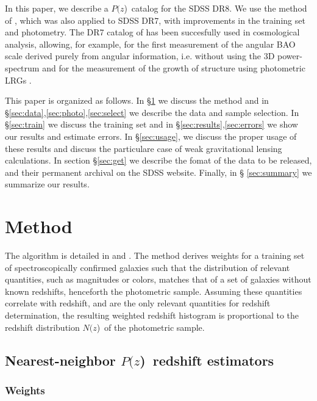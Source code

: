 \documentclass[preprint]{aastex}
\newcommand{\pofz}{$P(z$)}
\newcommand{\Nofz}{$N(z$)}
\begin{document}
In this paper, we describe a \pofz\ catalog for the SDSS DR8.  We use the
method of \citet{CunhaPhotoz09}, which was also applied to SDSS DR7, with
improvements in the training set and  photometry.  The DR7 catalog of
\cite{CunhaPhotoz09} has been succesfully used in cosmological analysis,
allowing, for example, for the  first measurement of the angular BAO scale
derived purely from angular information, i.e. without using the 3D
power-spectrum \citep{car11}  and for the measurement of the growth of
structure using photometric LRGs \citep{cro11}. 

This paper is organized as follows.  In \S \ref{sec:method} we discuss the
method and in \S \ref{sec:data},\ref{sec:photo},\ref{sec:select} we describe
the data and sample selection. In \S \ref{sec:train} we discuss the training
set and in \S \ref{sec:results},\ref{sec:errors} we show our results and
estimate errors.  In \S \ref{sec:usage}, we discuss the proper usage of these
results and discuss the particulare case of weak gravitational lensing
calculations.  In section \S \ref{sec:get} we describe the fomat of the data to
be released, and their permanent archival on the SDSS website.  Finally, in \S
\ref{sec:summary} we summarize our results.

\section{Method} \label{sec:method}

The algorithm is detailed in \citet{LimaPhotoz08} and \citet{CunhaPhotoz09}.
The method derives weights for a training set of spectroscopically confirmed
galaxies such that the distribution of relevant quantities, such as magnitudes
or colors, matches that of a %
set of galaxies without known redshifts, henceforth the photometric sample.
Assuming these quantities correlate with redshift, and are the only relevant
quantities for redshift determination, the resulting weighted redshift
histogram is proportional to the redshift %
distribution \Nofz\ of the photometric sample. 

\subsection{Nearest-neighbor \pofz\ redshift estimators}\label{sec:nnpz}

\subsubsection{Weights}
\end{document}
